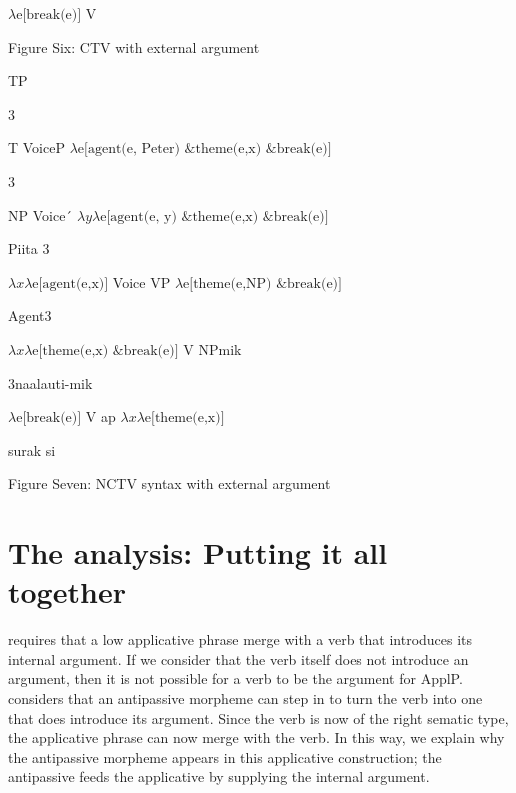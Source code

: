 \documentclass[output=paper,modfonts,nonflat]{langsci/langscibook}
\begin{document}
 $\lambda \text{e[break(e)]}$                         V

\begin{stylecaption}
Figure Six: CTV with external argument
\end{stylecaption}

    TP

     3

     T          VoiceP      $\lambda \text{e[}\text{agent(e, Peter) \&} \text{theme(}\text{e,x}\text{) \& break(e)]}$

     3

    NP     Voice´   $\mathit{\lambda y\lambda} \text{e[}\text{agent(e, y) \&} \text{theme(}\text{e,x}\text{) \& break(e)]}$

            Piita  3

 $\mathit{\lambda x\lambda} \text{e[agent(e,x)]}$         Voice     VP       $\lambda \text{e[}\text{theme(e,NP) \& break(e)]}$

            Agent3

 $\mathit{\lambda x\lambda} \text{e[theme(e,x) \& break(e)]}$  V   NPmik

3naalauti-mik

 $\lambda \text{e[break(e)]}$                V      ap         $\mathit{\lambda x\lambda} \text{e[}\text{theme(e,x)]}$

             surak      si

\begin{stylecaption}
Figure Seven: NCTV syntax with external argument
\end{stylecaption}

\section{The analysis: Putting it all together} %

\citet{Pyllkänen2008} requires that a low applicative phrase merge with a verb that introduces its internal argument.  If we consider that the verb itself does not introduce an argument, then it is not possible for a verb to be the argument for ApplP.   \citet{Basilico2017} considers that an antipassive morpheme can step in to turn the verb into one that does introduce its argument.  Since the verb is now of the right sematic type, the applicative phrase can now merge with the verb. In this way, we explain why the antipassive morpheme appears in this applicative construction; the antipassive feeds the applicative by supplying the internal argument.
\end{document}
